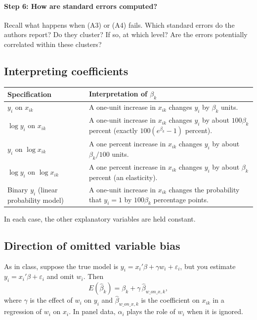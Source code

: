 \documentclass[12pt,a4paper]{article}
\begin{document}
\paragraph{Step 6: How are standard errors computed?}
Recall what happens when (A3) or (A4) fails. Which standard errors do the authors report? Do they cluster? If so, at which level? Are the errors potentially correlated within these clusters?
 
\subsection{Interpreting coefficients}
 
\begin{tabularx}{\textwidth}{@{}P{0.3\textwidth}L@{}}
\toprule
\textbf{Specification} & \textbf{Interpretation of $\beta_k$} \\
\midrule
$y_i$ on $x_{ik}$ & A one-unit increase in $x_{ik}$ changes $y_i$ by $\beta_k$ units. \\
$\log y_i$ on $x_{ik}$ & A one-unit increase in $x_{ik}$ changes $y_i$ by about $100\beta_k$ percent (exactly $100(e^{\beta_k}-1)$ percent). \\
$y_i$ on $\log x_{ik}$ & A one percent increase in $x_{ik}$ changes $y_i$ by about $\beta_k/100$ units. \\
$\log y_i$ on $\log x_{ik}$ & A one percent increase in $x_{ik}$ changes $y_i$ by about $\beta_k$ percent (an elasticity). \\
Binary $y_i$ (linear probability model) & A one-unit increase in $x_{ik}$ changes the probability that $y_i = 1$ by $100\beta_k$ percentage points. \\
\bottomrule
\end{tabularx}
 
In each case, the other explanatory variables are held constant.

\subsection{Direction of omitted variable bias}

As in class, suppose the true model is $y_i = x_i'\beta + \gamma w_i + \varepsilon_i$, but you estimate $y_i = x_i'\beta + \varepsilon_i$ and omit $w_i$. Then
\[
  E(\hat\beta_k) = \beta_k + \gamma \, \hat\beta_{w\_on\_x,k} ,
\]
where $\gamma$ is the effect of $w_i$ on $y_i$ and $\hat\beta_{w\_on\_x,k}$ is the coefficient on $x_{ik}$ in a regression of $w_i$ on $x_i$. In panel data, $\alpha_i$ plays the role of $w_i$ when it is ignored.
 
\end{document}
